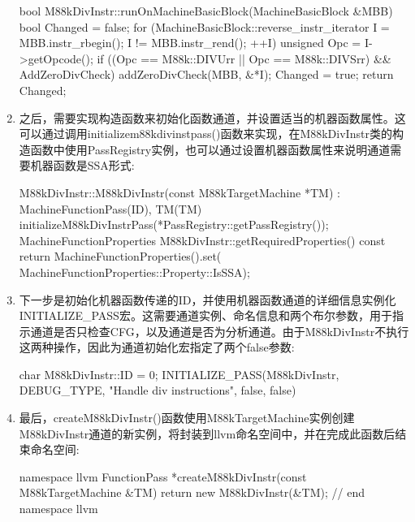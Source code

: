 \begin{enumerate}
\begin{cpp}
bool M88kDivInstr::runOnMachineBasicBlock(MachineBasicBlock
&MBB) {
    bool Changed = false;
    for (MachineBasicBlock::reverse_instr_iterator I =
    MBB.instr_rbegin();
            I != MBB.instr_rend(); ++I) {
        unsigned Opc = I->getOpcode();
        if ((Opc == M88k::DIVUrr || Opc == M88k::DIVSrr) &&
        AddZeroDivCheck) {
            addZeroDivCheck(MBB, &*I);
            Changed = true;
        }
    }
    return Changed;
}
\end{cpp}

\item
之后，需要实现构造函数来初始化函数通道，并设置适当的机器函数属性。这可以通过调用initializem88kdivinstpass()函数来实现，在M88kDivInstr类的构造函数中使用PassRegistry实例，也可以通过设置机器函数属性来说明通道需要机器函数是SSA形式:

\begin{cpp}
M88kDivInstr::M88kDivInstr(const M88kTargetMachine *TM)
: MachineFunctionPass(ID), TM(TM) {
    initializeM88kDivInstrPass(*PassRegistry::getPassRegistry());
}
MachineFunctionProperties M88kDivInstr::getRequiredProperties()
const {
    return MachineFunctionProperties().set(
        MachineFunctionProperties::Property::IsSSA);
}
\end{cpp}

\item
下一步是初始化机器函数传递的ID，并使用机器函数通道的详细信息实例化INITIALIZE\_PASS宏。这需要通道实例、命名信息和两个布尔参数，用于指示通道是否只检查CFG，以及通道是否为分析通道。由于M88kDivInstr不执行这两种操作，因此为通道初始化宏指定了两个false参数:

\begin{cpp}
char M88kDivInstr::ID = 0;
INITIALIZE_PASS(M88kDivInstr, DEBUG_TYPE, "Handle div instructions", false, false)
\end{cpp}

\item
最后，createM88kDivInstr()函数使用M88kTargetMachine实例创建M88kDivInstr通道的新实例，将封装到llvm命名空间中，并在完成此函数后结束命名空间:

\begin{cpp}
namespace llvm {
FunctionPass *createM88kDivInstr(const M88kTargetMachine &TM) {
    return new M88kDivInstr(&TM);
}
} // end namespace llvm
\end{cpp}
\end{enumerate}



